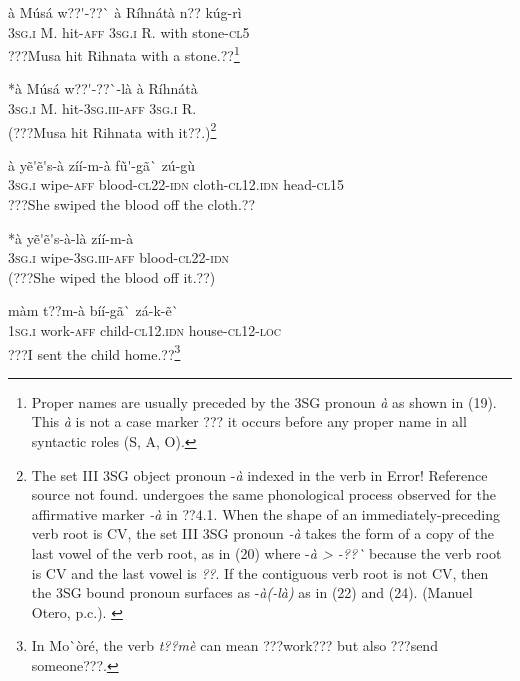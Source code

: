 \documentclass[output=paper]{langsci/langscibook}
\begin{document}
\ea \gll 
\label{bkm:Ref424201679}à    Músá    w??\'{ }-??\`{ }    à    Ríhnátà  n??  kúg-rì
\\
%
\textsc{3sg.i  }  M.    hit-\textsc{aff  3sg.i  }  R.    with  stone-\textsc{cl5}
\\\glt
???Musa hit Rihnata with a stone.??\footnote{ Proper names are usually preceded by the 3SG pronoun\textit{ à} as shown in (19). This \textit{à} is not a case marker ??? it occurs before any proper name in all syntactic roles (S, A, O).}
\z


\ea \gll 
\label{bkm:Ref424201687}*à    Músá    w??\'{ }-??\`{ }-là    à    Ríhnátà
\\
%
\textsc{3sg.i  }  M.    hit-\textsc{3sg.iii-aff}  \textsc{3sg.i  }  R.
\\\glt
(???Musa hit Rihnata with it??.)\footnote{ {The set III 3SG object pronoun -}{\textit{à}}{ indexed in the verb in }{Error! Reference source not found.}{ undergoes the same phonological process observed for the affirmative marker }{\textit{{}-à}}{ in ??4.1. When the shape of an immediately-preceding verb root is CV, the  set III 3SG pronoun }{\textit{{}-à}}{ takes the form of a copy of the last vowel of the verb root, as in }{(20)}{ where -}{\textit{à {\textgreater} -??\`{ }}}{ because the verb root is CV and the last vowel is}{\textit{ ??}}{. If the contiguous verb root is not CV, then the 3SG bound pronoun surfaces as -}{\textit{à(-là)}}{ as in }{(22)}{ and }{(24)}{. (Manuel Otero, p.c.).  }}
\z


\ea \gll 
\label{bkm:Ref424201761}à    yẽ\'{ }ẽ\'{ }s-à    zíí-m-à    fũ\'{ }-gã\`{ }      zú-gù
\\
%
\textsc{3sg.i  }  wipe-\textsc{aff}  blood-\textsc{cl22-idn}  cloth-\textsc{cl12.idn}  head-\textsc{cl15}
\\\glt
???She swiped the blood off the cloth.??
\z


\ea \gll 
\label{bkm:Ref424201769}*à    yẽ\'{ }ẽ\'{ }s-à-là    zíí-m-à
\\
%
\textsc{3sg.i  }  wipe-\textsc{3sg.iii-aff}  blood-\textsc{cl22-idn}
\\\glt
(???She wiped the blood off it.??)
\z


\ea \gll 
\label{bkm:Ref424201799}màm    t??m-à    bíí-gã\`{ }      zá-k-ẽ\`{ }
\\
%
\textsc{1sg.i  }  work-\textsc{aff}  child-\textsc{cl12.idn}  house-\textsc{cl12-loc}
\\\glt
???I sent the child home.??\footnote{ In Mo\`{ }òré, the verb \textit{t??mè} can mean ???work??? but also ???send someone???. }
\z
\end{document}
